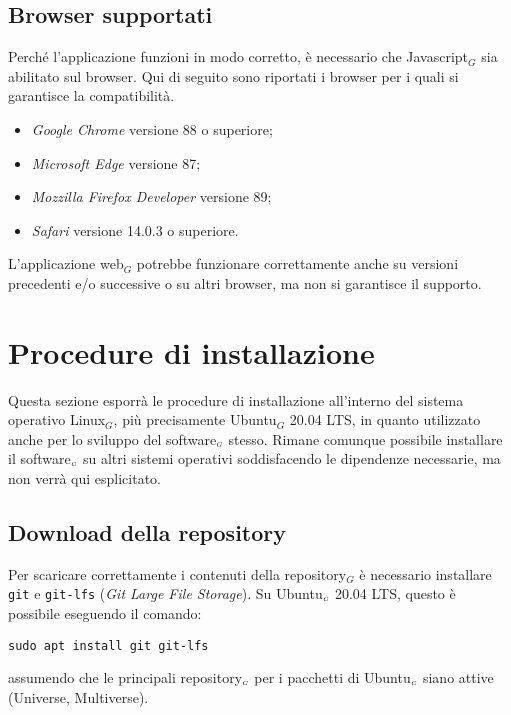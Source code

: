 \subsection{Browser supportati}\label{RequisitiDiSistemaEdInstallazioneRequisitiBrowserSupportati}
Perché l'applicazione funzioni in modo corretto, è necessario che Javascript$_G$ sia abilitato sul browser. 
Qui di seguito sono riportati i browser per i quali si garantisce la compatibilità. 
\begin{itemize}
	\item \textit{Google Chrome} versione 88 o superiore;
	\item \textit{Microsoft Edge} versione 87;
	\item \textit{Mozzilla Firefox Developer} versione 89;
	\item \textit{Safari} versione 14.0.3 o superiore.
\end{itemize}
L'applicazione web$_G$ potrebbe funzionare correttamente anche su versioni precedenti e/o successive o su altri browser, ma non si garantisce il supporto. 

\section{Procedure di installazione}\label{RequisitiDiSistemaEdInstallazioneInstallazione}
Questa sezione esporrà le procedure di installazione all'interno del sistema operativo Linux$_G$, più precisamente Ubuntu$_G$ 20.04 LTS, in quanto utilizzato anche per lo sviluppo del software$_{\scaleto{G}{3pt}}$ stesso.
Rimane comunque possibile installare il software$_{\scaleto{G}{3pt}}$ su altri sistemi operativi soddisfacendo le dipendenze necessarie, ma non verrà qui esplicitato.

\subsection{Download della  repository}\label{RequisitiDiSistemaEdInstallazioneInstallazioneDownloadRepo}
Per scaricare correttamente i contenuti della repository$_G$ è necessario installare \texttt{git} e \texttt{git-lfs} (\textit{Git Large File Storage}).
Su Ubuntu$_{\scaleto{G}{3pt}}$ 20.04 LTS, questo è possibile eseguendo il comando:
\begin{lstlisting}
sudo apt install git git-lfs
\end{lstlisting}
assumendo che le principali repository$_{\scaleto{G}{3pt}}$ per i pacchetti di Ubuntu$_{\scaleto{G}{3pt}}$ siano attive (Universe, Multiverse).

